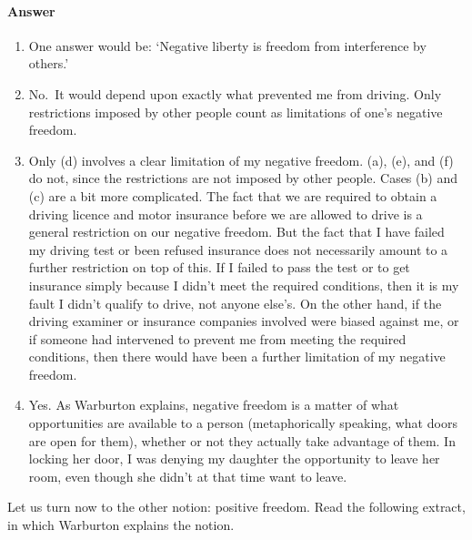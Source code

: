 \documentclass[letterpaper,10pt,english]{sphinxmanual}
\begin{document}
\paragraph{Answer}
\label{\detokenize{content/session_00/Part_00_02:Answer}}\begin{enumerate}
%
\item {} 
One answer would be: ‘Negative liberty is freedom from interference by others.’

\item {} 
No. It would depend upon exactly what prevented me from driving. Only restrictions imposed by other people count as limitations of one’s negative freedom.

\item {} 
Only (d) involves a clear limitation of my negative freedom. (a), (e), and (f) do not, since the restrictions are not imposed by other people. Cases (b) and (c) are a bit more complicated. The fact that we are required to obtain a driving licence and motor insurance before we are allowed to drive is a general restriction on our negative freedom. But the fact that I have failed my driving test or been refused insurance does not necessarily amount to a further restriction on top of this. If I
failed to pass the test or to get insurance simply because I didn’t meet the required conditions, then it is my fault I didn’t qualify to drive, not anyone else’s. On the other hand, if the driving examiner or insurance companies involved were biased against me, or if someone had intervened to prevent me from meeting the required conditions, then there would have been a further limitation of my negative freedom.

\item {} 
Yes. As Warburton explains, negative freedom is a matter of what opportunities are available to a person (metaphorically speaking, what doors are open for them), whether or not they actually take advantage of them. In locking her door, I was denying my daughter the opportunity to leave her room, even though she didn’t at that time want to leave.

\end{enumerate}

Let us turn now to the other notion: positive freedom. Read the following extract, in which Warburton explains the notion.
\end{document}
